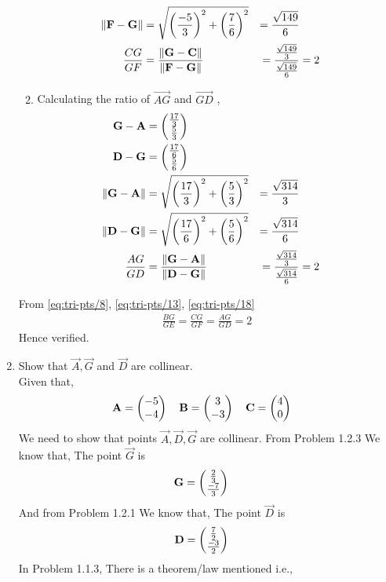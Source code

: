 \documentclass[10pt]{book}
\begin{document}
\begin{enumerate}[label=\thesection.\arabic*.,ref=\thesection.\theenumi]
\begin{enumerate}
\begin{align}
		\label{eq:tri-pts/12} \norm{\vec{F}-\vec{G}} &= \sqrt{\brak{\frac{-5}{3}}^{2} + \brak{\frac{7}{6}}^{2}} &= \frac{\sqrt{149}}{6} \\
		\label{eq:tri-pts/13}\frac{CG}{GF} &= \frac{\norm{\vec{G}-\vec{C}}}{\norm{\vec{F}-\vec{G}}} &= \frac{\frac{\sqrt{149}}{3}}{\frac{\sqrt{149}}{6}} &= 2		
\end{align}
\item Calculating the ratio of $\vec{AG}$ and $\vec{GD}$ ,
\begin{align}
		\label{eq:tri-pts/14} \vec{G}-\vec{A} &= \myvec{\frac{17}{3} \\ \frac{5}{3}} \\
		\label{eq:tri-pts/15} \vec{D}-\vec{G} &= \myvec{\frac{17}{6} \\ \frac{5}{6}} \\
		\label{eq:tri-pts/16} \norm{\vec{G}-\vec{A}} &= \sqrt{\brak{\frac{17}{3}}^{2} + \brak{\frac{5}{3}}^{2}} &= \frac{\sqrt{314}}{3} \\
		\label{eq:tri-pts/17} \norm{\vec{D}-\vec{G}} &= \sqrt{\brak{\frac{17}{6}}^{2}+\brak{\frac{5}{6}}^{2}} &= \frac{\sqrt{314}}{6} \\
		\label{eq:tri-pts/18}\frac{AG}{GD} &= \frac{\norm{\vec{G}-\vec{A}}}{\norm{\vec{D}-\vec{G}}} &= \frac{\frac{\sqrt{314}}{3}}{\frac{\sqrt{314}}{6}} &= 2 
\end{align}
\end{enumerate}

From \eqref{eq:tri-pts/8}, \eqref{eq:tri-pts/13}, \eqref{eq:tri-pts/18}
\begin{align}
		\frac{BG}{GE} = 
		\frac{CG}{GF} =
		\frac{AG}{GD} = 2
\end{align}
Hence verified.


\item Show that $\vec{A}, \vec{G}$ and $\vec{D}$ are collinear.\\
\solution 
Given that,
\begin{align}
    \mathbf{A} = \begin{pmatrix}-5\\-4\end{pmatrix}
    \quad
    \mathbf{B} &= \begin{pmatrix}3\\-3\end{pmatrix}
    \quad
    \mathbf{C} = \begin{pmatrix}4\\0\end{pmatrix}
\end{align}
We need to show that points $\vec{A},\vec{D},\vec{G}$ are collinear.
From Problem 1.2.3 We know that, The point $\vec{G}$ is 
\begin{align}
    \mathbf{G} &=\begin{pmatrix}\frac{2}{3}\\ \frac{-7}{3}\end{pmatrix}
\end{align}
And from Problem 1.2.1 We know that, The point $\vec{D}$ is 
\begin{align}
    \mathbf{D} &=\begin{pmatrix}\frac{7}{2}\\ \frac{-3}{2}\end{pmatrix}
\end{align}
In Problem 1.1.3, There is a theorem/law mentioned i.e.,


\end{enumerate}
\end{document}
